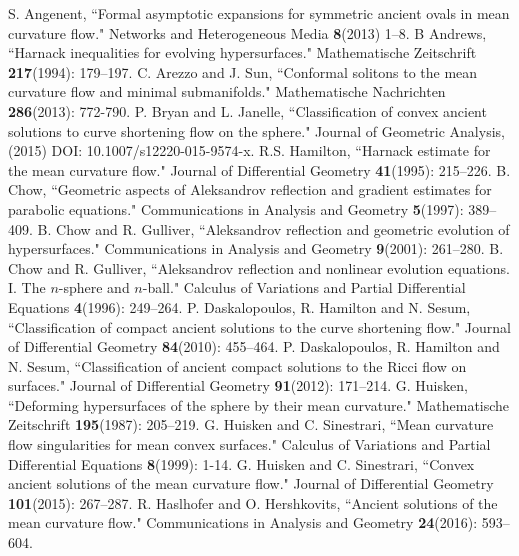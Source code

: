 \documentclass{amsart}
\theoremstyle{definition}
\theoremstyle{remark}
\numberwithin{equation}{section}
\begin{document}
\begin{thebibliography}{10}
 S. Angenent, ``Formal asymptotic expansions for symmetric ancient ovals in mean curvature flow." Networks and Heterogeneous Media \textbf{8}(2013) 1--8.
 B Andrews, ``Harnack inequalities for evolving hypersurfaces." Mathematische Zeitschrift \textbf{217}(1994): 179--197.
 C. Arezzo and J. Sun, ``Conformal solitons to the mean curvature flow and minimal submanifolds." Mathematische Nachrichten \textbf{286}(2013): 772-790.
 P. Bryan and L. Janelle, ``Classification of convex ancient solutions to curve shortening flow on the sphere." Journal of Geometric Analysis, (2015) DOI: 10.1007/s12220-015-9574-x.
 R.S. Hamilton, ``Harnack estimate for the mean curvature flow." Journal of Differential Geometry \textbf{41}(1995): 215--226.
 B. Chow, ``Geometric aspects of Aleksandrov reflection and gradient estimates for parabolic equations." Communications in Analysis and Geometry \textbf{5}(1997): 389--409.
 B. Chow and R. Gulliver, ``Aleksandrov reflection and geometric evolution of hypersurfaces." Communications in Analysis and Geometry \textbf{9}(2001): 261--280.
 B. Chow and R. Gulliver, ``Aleksandrov reflection and nonlinear evolution equations. I. The $n$-sphere and $n$-ball." Calculus of Variations and Partial Differential Equations \textbf{4}(1996): 249--264.
 P. Daskalopoulos, R. Hamilton and N. Sesum, ``Classification of compact ancient solutions to the curve shortening flow." Journal of Differential Geometry \textbf{84}(2010): 455--464.
 P. Daskalopoulos, R. Hamilton and N. Sesum, ``Classification of ancient compact solutions to the {R}icci flow on surfaces." Journal of Differential Geometry \textbf{91}(2012): 171--214.
 G. Huisken, ``Deforming hypersurfaces of the sphere by their mean curvature." Mathematische Zeitschrift \textbf{195}(1987): 205--219.
 G. Huisken and C. Sinestrari, ``Mean curvature flow singularities for mean convex surfaces." Calculus of Variations and Partial Differential Equations \textbf{8}(1999): 1-14.
 G. Huisken and C. Sinestrari, ``Convex ancient solutions of the mean curvature flow." Journal of Differential Geometry \textbf{101}(2015): 267--287.
 R. Haslhofer and O. Hershkovits, ``Ancient solutions of the mean curvature flow." Communications in Analysis and Geometry \textbf{24}(2016): 593--604.

\end{thebibliography}
\end{document}
